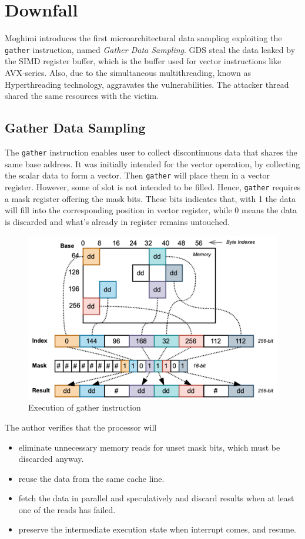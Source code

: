 \section{Downfall}
Moghimi\cite{downfall} introduces the first microarchitectural data sampling exploiting the \verb|gather| instruction, named \textit{Gather Data Sampling}. GDS steal the data leaked by the SIMD register buffer, which is the buffer used for vector instructions like AVX-series.
Also, due to the simultaneous multithreading, known as Hyperthreading technology, aggravates the vulnerabilities. The attacker
thread shared the same resources with the victim.

\subsection{Gather Data Sampling}
The \verb|gather| instruction enables user to collect discontinuous data that shares the same base address.
It was initially intended for the vector operation, by collecting the scalar data to form a vector. Then \verb|gather| will
place them in a vector register. However, some of slot is not intended to be filled. Hence, \verb|gather| requires a mask register
offering the mask bits. These bits indicates that, with 1 the data will fill into the corresponding position in vector register, while 0 means the
data is discarded and what's already in register remains untouched.

\begin{figure}[!htbp]
    \centering
    \includegraphics[width=0.99\linewidth]{Figure/gather.png}
    \caption{Execution of gather instruction}
\end{figure}

The author verifies that the processor will
\begin{itemize}
    \item eliminate unnecessary memory reads for unset mask bits, which must be discarded anyway.
    \item reuse the data from the same cache line.
    \item fetch the data in parallel and speculatively and discard results when at least one of the reads has failed.
    \item preserve the intermediate execution state when interrupt comes, and resume.
\end{itemize}

